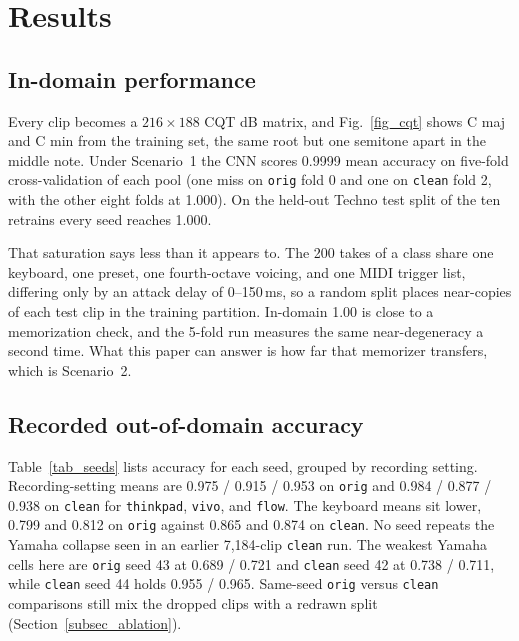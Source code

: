 \documentclass[pdflatex,sn-mathphys-num,iicol]{sn-jnl}
\begin{document}
\section{Results}\label{sec_results}

\subsection{In-domain performance}\label{subsec_res_indomain}

Every clip becomes a $216 \times 188$ CQT dB matrix, and Fig.~\ref{fig_cqt} shows C maj and C min from the training set, the same root but one semitone apart in the middle note. Under Scenario~1 the CNN scores 0.9999 mean accuracy on five-fold cross-validation of each pool (one miss on \texttt{orig} fold 0 and one on \texttt{clean} fold 2, with the other eight folds at 1.000). On the held-out Techno test split of the ten retrains every seed reaches 1.000.

That saturation says less than it appears to. The 200 takes of a class share one keyboard, one preset, one fourth-octave voicing, and one MIDI trigger list, differing only by an attack delay of 0--150\,ms, so a random split places near-copies of each test clip in the training partition. In-domain 1.00 is close to a memorization check, and the 5-fold run measures the same near-degeneracy a second time. What this paper can answer is how far that memorizer transfers, which is Scenario~2.

\subsection{Recorded out-of-domain accuracy}\label{subsec_res_recorded}

Table~\ref{tab_seeds} lists accuracy for each seed, grouped by recording setting. Recording-setting means are 0.975 / 0.915 / 0.953 on \texttt{orig} and 0.984 / 0.877 / 0.938 on \texttt{clean} for \texttt{thinkpad}, \texttt{vivo}, and \texttt{flow}. The keyboard means sit lower, 0.799 and 0.812 on \texttt{orig} against 0.865 and 0.874 on \texttt{clean}. No seed repeats the Yamaha collapse seen in an earlier 7{,}184-clip \texttt{clean} run. The weakest Yamaha cells here are \texttt{orig} seed 43 at 0.689 / 0.721 and \texttt{clean} seed 42 at 0.738 / 0.711, while \texttt{clean} seed 44 holds 0.955 / 0.965. Same-seed \texttt{orig} versus \texttt{clean} comparisons still mix the dropped clips with a redrawn split (Section~\ref{subsec_ablation}).
\end{document}
